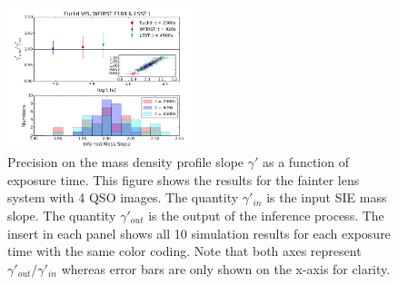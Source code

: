 \documentclass[a4paper,11pt]{article}
\begin{document}
\begin{figure}
\begin{center}
\includegraphics[width=0.49\textwidth]{figures/gamma_hist_135949_4QSO_EWL.png}
\end{center}
\caption{Precision on the mass density profile slope $\gamma'$ as a function of exposure time.  This figure shows the results for the fainter lens system with 4 QSO images. The quantity $\gamma'_{in}$ is the input SIE mass slope. The quantity $\gamma'_{out}$ is the output of the inference process.
The insert in each panel shows all 10 simulation results for each exposure time with the same color coding. Note that both axes represent $\gamma'_{out}/\gamma'_{in}$ whereas error bars are only shown on the x-axis for clarity.}
\label{fig:gamma_fainter_4QSOimages}
\end{figure}
\end{document}
